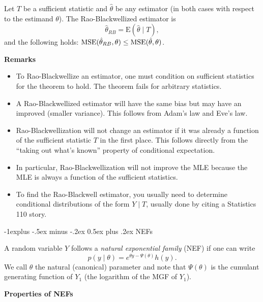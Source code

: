 \documentclass[10pt,landscape]{article}
\makeatletter
\renewcommand{\subsection}{\@startsection{subsection}{2}{0mm}%
                                {-1explus -.5ex minus -.2ex}%
                                {0.5ex plus .2ex}%
                                {\normalfont\normalsize\bfseries}}
\newcommand{\E}{\text{E}}
\makeatother
\begin{document}
\begin{multicols*}{3}
Let $T$ be a sufficient statistic and $\hat{\theta}$ be any estimator (in both cases with respect to the estimand $\theta$). The Rao-Blackwellized estimator is $$\hat{\theta}_{RB}=\E (\hat{\theta}\mid T),$$ and the following holds: $\operatorname{MSE}(\hat{\theta}_{RB},\theta)\leq \operatorname{MSE}(\hat{\theta},\theta)$.

\textbf{Remarks}
\begin{itemize}
    \item To Rao-Blackwellize an estimator, one must condition on sufficient statistics for the theorem to hold. The theorem fails for arbitrary statistics.
    \item A Rao-Blackwellized estimator will have the same bias but may have an improved (smaller variance). This follows from Adam's law and Eve's law.
    \item Rao-Blackwellization will not change an estimator if it was already a function of the sufficient statistic $T$ in the first place. This follows directly from the ``taking out what's known'' property of conditional expectation.
    \item In particular, Rao-Blackwellization will not improve the MLE because the MLE is always a function of the sufficient statistics.
    \item To find the Rao-Blackwell estimator, you usually need to determine conditional distributions of the form $Y\mid T$, usually done by citing a Statistics 110 story.
\end{itemize}



\subsection{NEFs}

A random variable $Y$ follows a \emph{natural exponential family} (NEF) if one can write $$p(y\mid \theta)=e^{\theta y-\Psi(\theta)}h(y).$$ We call $\theta$ the natural (canonical) parameter and note that $\Psi(\theta)$ is the cumulant generating function of $Y_1$ (the logarithm of the MGF of $Y_1$).

\textbf{Properties of NEFs}


\end{multicols*}
\end{document}
